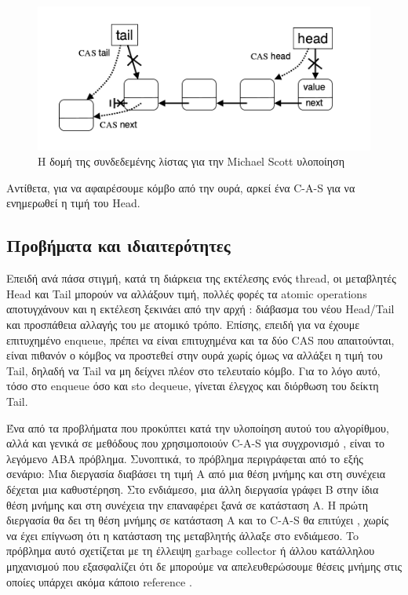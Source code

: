 \begin{figure}
 \centering
  \includegraphics[scale=0.4]{msqueue_struct.png}
\caption{ Η δομή της συνδεδεμένης λίστας για την \textlatin{Michael Scott} υλοποίηση}
\end{figure}


Αντίθετα, για να αφαιρέσουμε κόμβο από την ουρά, αρκεί ένα \textlatin{C-A-S}  για να ενημερωθεί η τιμή του \textlatin{Head}.


\subsection{Προβήματα και ιδιαιτερότητες}
Επειδή ανά πάσα στιγμή, κατά τη διάρκεια της εκτέλεσης ενός \textlatin{thread}, οι μεταβλητές \textlatin{Head} και \textlatin{Tail} μπορούν να αλλάξουν τιμή, πολλές φορές τα \textlatin{atomic operations} αποτυγχάνουν και η εκτέλεση ξεκινάει από την αρχή : διάβασμα του νέου \textlatin{Head/Tail} και προσπάθεια αλλαγής του με ατομικό τρόπο. Επίσης, επειδή για να έχουμε επιτυχημένο \textlatin{enqueue}, πρέπει να είναι επιτυχημένα και τα δύο \textlatin{CAS} που απαιτούνται, είναι πιθανόν ο κόμβος να προστεθεί στην ουρά χωρίς όμως να αλλάξει η τιμή του \textlatin{Tail}, δηλαδή να \textlatin{Tail} να μη δείχνει πλέον στο τελευταίο κόμβο. Για το λόγο αυτό, τόσο στο \textlatin{enqueue} όσο και sto \textlatin{dequeue}, γίνεται έλεγχος και διόρθωση του δείκτη \textlatin{Tail}.

Ένα από τα προβλήματα που προκύπτει κατά την υλοποίηση αυτού του αλγορίθμου, αλλά και γενικά σε μεθόδους που χρησιμοποιούν \textlatin{C-A-S} για συγχρονισμό , είναι το λεγόμενο ABA πρόβλημα. Συνοπτικά, το πρόβλημα περιγράφεται από το εξής σενάριο: Μια διεργασία διαβάσει τη τιμή Α από μια θέση μνήμης και στη συνέχεια  δέχεται μια καθυστέρηση. Στο ενδιάμεσο, μια άλλη διεργασία γράφει Β στην ίδια θέση μνήμης και στη συνέχεια την επαναφέρει ξανά σε κατάσταση Α. Η πρώτη διεργασία θα δει τη θέση μνήμης σε κατάσταση Α και το \textlatin{C-A-S} θα επιτύχει , χωρίς να έχει επίγνωση ότι η κατάσταση της μεταβλητής άλλαξε στο ενδιάμεσο. To πρόβλημα αυτό σχετίζεται με τη έλλειψη \textlatin{garbage collector} ή άλλου κατάλληλου μηχανισμού που εξασφαλίζει ότι δε μπορούμε να απελευθερώσουμε θέσεις μνήμης στις οποίες υπάρχει ακόμα κάποιο \textlatin{reference} .

